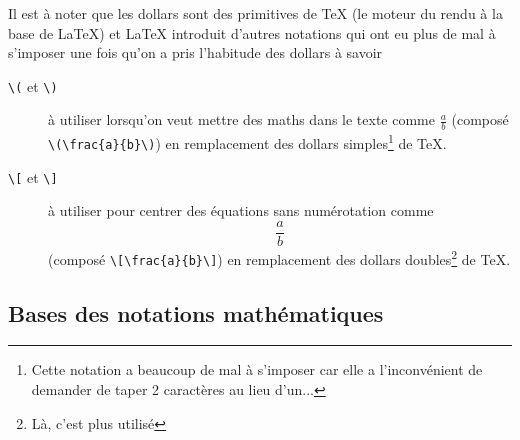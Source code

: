 \documentclass[12pt,a4paper]{article}
\newcommand{\cmd}[1]{\texttt{\textbackslash#1}}
\begin{document}
Il est à noter que les dollars sont des primitives de \TeX{} (le moteur du rendu à la base de \LaTeX{}) et \LaTeX{} introduit d'autres notations qui ont eu plus de mal à s'imposer une fois qu'on a pris l'habitude des dollars à savoir
\begin{description}
	\item[\cmd{(} et \cmd{)}] à utiliser lorsqu'on veut mettre des maths dans le texte comme \(\frac{a}{b}\) (composé \verb|\(\frac{a}{b}\)|) en remplacement des dollars simples\footnote{Cette notation a beaucoup de mal à s'imposer car elle a l'inconvénient de demander de taper 2 caractères au lieu d'un...} de \TeX{}.
    \item[\cmd{[} et \cmd{]}] à utiliser pour centrer des équations sans numérotation comme \[\frac{a}{b}\] (composé \verb|\[\frac{a}{b}\]|) en remplacement des dollars doubles\footnote{Là, c'est plus utilisé} de \TeX{}.
\end{description}

\subsection{Bases des notations mathématiques}
\end{document}
